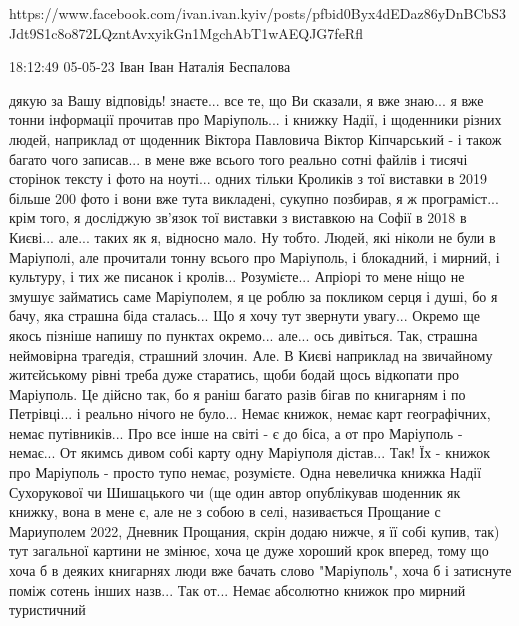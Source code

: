  
 
 
 
 

https://www.facebook.com/ivan.ivan.kyiv/posts/pfbid0Byx4dEDaz86yDnBCbS3Jdt9S1c8o872LQzntAvxyikGn1MgchAbT1wAEQJG7feRfl

18:12:49 05-05-23
Іван Іван
Наталія Беспалова 

дякую за Вашу відповідь! знаєте... все те, що Ви сказали, я вже знаю... я вже
тонни інформації прочитав про Маріуполь... і книжку Надії, і щоденники різних
людей, наприклад от щоденник Віктора Павловича Віктор Кіпчарський - і також
багато чого записав... в мене вже всього того реально сотні файлів і тисячі
сторінок тексту і фото на ноуті... одних тільки Кроликів з тої виставки в 2019
більше 200 фото і вони вже тута викладені, сукупно позбирав, я ж програміст...
крім того, я досліджую зв'язок тої виставки з виставкою на Софії в 2018 в
Києві... але... таких як я, відносно мало. Ну тобто. Людей, які ніколи не були
в Маріуполі, але прочитали тонну всього про Маріуполь, і блокадний, і мирний, і
культуру, і тих же писанок і кролів... Розумієте... Апріорі то мене ніщо не
змушує займатись саме Маріуполем, я це роблю за покликом серця і душі, бо я
бачу, яка страшна біда сталась... Що я хочу тут звернути увагу... Окремо ще
якось пізніше напишу по пунктах окремо... але... ось дивіться. Так, страшна
неймовірна трагедія, страшний злочин. Але. В Києві наприклад на звичайному
житєйському рівні треба дуже старатись, щоби бодай щось відкопати про
Маріуполь. Це дійсно так, бо я раніш багато разів бігав по книгарням і по
Петрівці... і реально нічого не було... Немає книжок, немає карт географічних,
немає путівників... Про все інше на світі - є до біса, а от про Маріуполь -
немає... От якимсь дивом собі карту одну Маріуполя дістав... Так! Їх - книжок
про Маріуполь - просто тупо немає, розумієте. Одна невеличка книжка Надії
Сухорукової чи Шишацького чи (ще один автор опублікував шоденник як книжку,
вона в мене є, але не з собою в селі, називається Прощание с Мариуполем 2022,
Дневник Прощания, скрін додаю нижче, я її собі купив, так) тут загальної
картини не змінює, хоча це дуже хороший крок вперед, тому що хоча б в деяких
книгарнях люди вже бачать слово "Маріуполь", хоча б і затиснуте поміж сотень
інших назв... Так от... Немає абсолютно книжок про мирний туристичний

